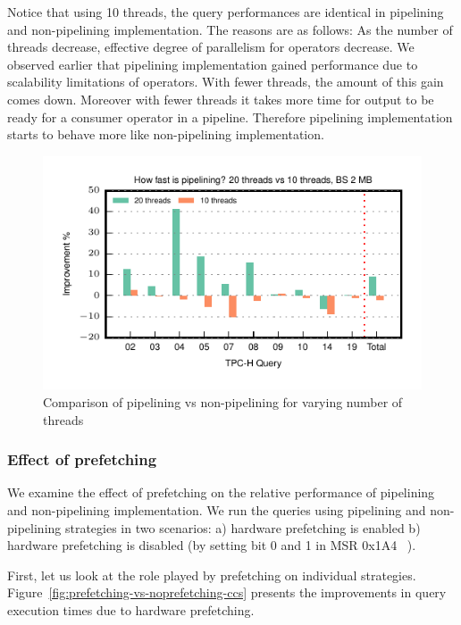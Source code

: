 Notice that using 10 threads, the query performances are identical in pipelining and non-pipelining implementation. 
The reasons are as follows:
 As the number of threads decrease, effective degree of parallelism for operators decrease. 
We observed earlier that pipelining implementation gained performance due to scalability limitations of operators.
With fewer threads, the amount of this gain comes down.
Moreover with fewer threads it takes more time for output to be ready for a consumer operator in a pipeline.
Therefore pipelining implementation starts to behave more like non-pipelining implementation.  

\begin{figure}
	\centering 
	\includegraphics[width=0.6\textheight]{pipeline/figures/thread-effect-ccs-bs2mb}
	\caption{Comparison of pipelining vs non-pipelining for varying number of threads}
	\label{fig:tpch-thread-effect-ccs}
\end{figure}

\subsubsection{Effect of prefetching}
We examine the effect of prefetching on the relative performance of pipelining and non-pipelining implementation. 
We run the queries using pipelining and non-pipelining strategies in two scenarios: a) hardware prefetching is enabled b) hardware prefetching is disabled (by setting bit 0 and 1 in MSR 0x1A4 ~\cite{intel-prefetching}).

First, let us look at the role played by prefetching on individual strategies.
Figure~\ref{fig:prefetching-vs-noprefetching-ccs} presents the improvements in query execution times due to hardware prefetching. 

